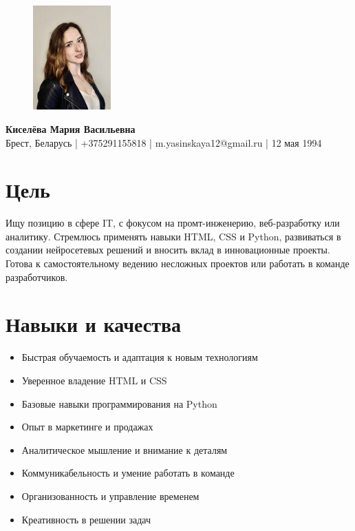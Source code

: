 \documentclass[a4paper,12pt]{article}
\begin{document}
\begin{center}
    \begin{figure}
        \vspace{-20pt}
        \includegraphics[width=3cm]{my-photo.jpg}
    \end{figure}
    {\LARGE\bfseries Киселёва Мария Васильевна} \\[0.2cm]
    Брест, Беларусь | +375291155818 | m.yasinskaya12@gmail.ru | 12 мая 1994
\end{center}

\section{Цель}
Ищу позицию в сфере IT, с фокусом на промт-инженерию, веб-разработку или аналитику. Стремлюсь применять навыки HTML, CSS и Python, развиваться в создании нейросетевых решений и вносить вклад в инновационные проекты. Готова к самостоятельному ведению несложных проектов или работать в команде разработчиков.

\section{Навыки и качества}
\begin{itemize}
    \item Быстрая обучаемость и адаптация к новым технологиям
    \item Уверенное владение HTML и CSS
    \item Базовые навыки программирования на Python
    \item Опыт в маркетинге и продажах
    \item Аналитическое мышление и внимание к деталям
    \item Коммуникабельность и умение работать в команде
    \item Организованность и управление временем
    \item Креативность в решении задач
\end{itemize}
\end{document}
